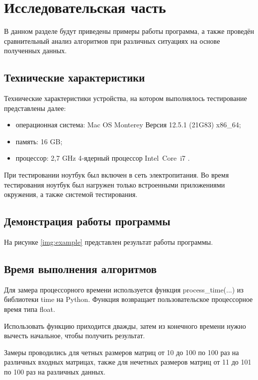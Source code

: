 \chapter{Исследовательская часть}

В данном разделе будут приведены примеры работы программа, а также проведён сравнительный анализ алгоритмов при различных ситуациях на основе полученных данных.

\section{Технические характеристики}

Технические характеристики устройства, на котором выполнялось тестирование представлены далее:

\begin{itemize}
	\item операционная система: Mac OS Monterey Версия 12.5.1 (21G83) \cite{macos} x86\_64;
	\item память: 16 GB;
	\item процессор: 2,7 GHz 4‑ядерный процессор Intel Core i7 \cite{intel}.
\end{itemize}

При тестировании ноутбук был включен в сеть электропитания. Во время тестирования ноутбук был нагружен только встроенными приложениями окружения, а также системой тестирования.

\section{Демонстрация работы программы}

На рисунке \ref{img:example} представлен результат работы программы.

\clearpage

\section{Время выполнения алгоритмов}

Для замера процессорного времени используется функция process\_time(...) из библиотеки time на Python. Функция возвращает пользовательское процессорное время типа float.

Использовать функцию приходится дважды, затем из конечного времени нужно вычесть начальное, чтобы получить результат.

Замеры проводились для четных размеров матриц от 10 до 100 по 100 раз на различных входных матрицах,  также  для нечетных размеров матриц от 11 до 101 по 100 раз на различных данных.

